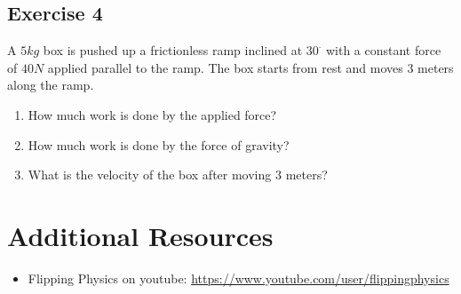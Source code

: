 \documentclass[11pt]{article}
\newenvironment{exercise}{
    \begin{mdframed}[style=problemstyle]\textcolor{black}{}
}{
    \end{mdframed}
}
\begin{document}
\subsection*{Exercise 4}
\begin{exercise}
    A $5kg$ box is pushed up a frictionless ramp inclined at $30^\cdot$ 
    with a constant force of $40N$ applied parallel to the ramp. The box
    starts from rest and moves $3$ meters along the ramp.
    \begin{enumerate}
        \item How much work is done by the applied force? 
        \item How much work is done by the force of gravity?
        \item What is the velocity of the box after moving $3$ meters?
    \end{enumerate}
\end{exercise}

\section*{Additional Resources}
\begin{itemize}
    \item Flipping Physics on youtube: 
        \url{https://www.youtube.com/user/flippingphysics} 
\end{itemize}
\end{document}

